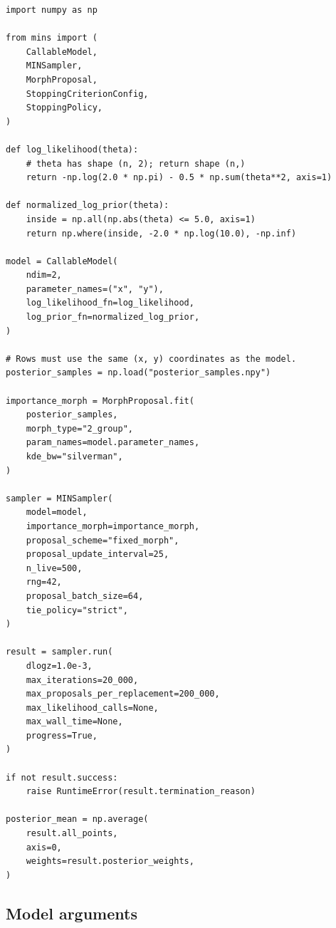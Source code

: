 \documentclass[11pt,a4paper]{article}
\begin{document}
\begin{lstlisting}
import numpy as np

from mins import (
    CallableModel,
    MINSampler,
    MorphProposal,
    StoppingCriterionConfig,
    StoppingPolicy,
)

def log_likelihood(theta):
    # theta has shape (n, 2); return shape (n,)
    return -np.log(2.0 * np.pi) - 0.5 * np.sum(theta**2, axis=1)

def normalized_log_prior(theta):
    inside = np.all(np.abs(theta) <= 5.0, axis=1)
    return np.where(inside, -2.0 * np.log(10.0), -np.inf)

model = CallableModel(
    ndim=2,
    parameter_names=("x", "y"),
    log_likelihood_fn=log_likelihood,
    log_prior_fn=normalized_log_prior,
)

# Rows must use the same (x, y) coordinates as the model.
posterior_samples = np.load("posterior_samples.npy")

importance_morph = MorphProposal.fit(
    posterior_samples,
    morph_type="2_group",
    param_names=model.parameter_names,
    kde_bw="silverman",
)

sampler = MINSampler(
    model=model,
    importance_morph=importance_morph,
    proposal_scheme="fixed_morph",
    proposal_update_interval=25,
    n_live=500,
    rng=42,
    proposal_batch_size=64,
    tie_policy="strict",
)

result = sampler.run(
    dlogz=1.0e-3,
    max_iterations=20_000,
    max_proposals_per_replacement=200_000,
    max_likelihood_calls=None,
    max_wall_time=None,
    progress=True,
)

if not result.success:
    raise RuntimeError(result.termination_reason)

posterior_mean = np.average(
    result.all_points,
    axis=0,
    weights=result.posterior_weights,
)
\end{lstlisting}

\subsection{Model arguments}
\end{document}
